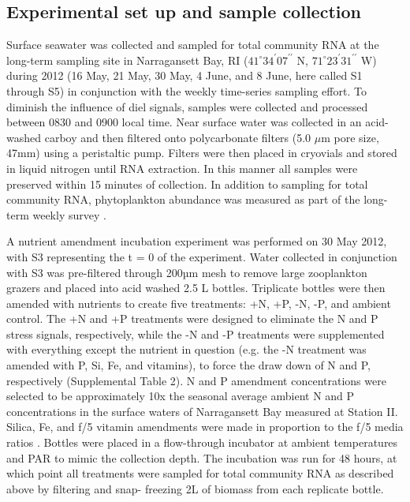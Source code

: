\subsection{Experimental set up and sample collection}
Surface seawater was collected and sampled for total community RNA at the long-term sampling site in Narragansett Bay, RI ($41^\circ 34^\prime 07^{\prime \prime}$ N, $71^\circ 23^\prime 31^{\prime \prime}$ W) during 2012 (16 May, 21 May, 30 May, 4 June, and 8 June, here called S1 through S5) in conjunction with the weekly time-series sampling effort. To diminish the influence of diel signals, samples were collected and processed between 0830 and 0900 local time. Near surface water was collected in an acid-washed carboy and then filtered onto polycarbonate filters (5.0 $\mu$m pore size, 47mm) using a peristaltic pump. Filters were then placed in cryovials and stored in liquid nitrogen until RNA extraction. In this manner all samples were preserved within 15 minutes of collection. In addition to sampling for total community RNA, phytoplankton abundance was measured as part of the long-term weekly survey \citep{Furnas1983, Furnas1982}.\par
A nutrient amendment incubation experiment was performed on 30 May 2012, with S3 representing the t = 0 of the experiment. Water collected in conjunction with S3 was pre-filtered through 200µm mesh to remove large zooplankton grazers and placed into acid washed 2.5 L bottles. Triplicate bottles were then amended with nutrients to create five treatments: +N, +P, -N, -P, and ambient control. The +N and +P treatments were designed to eliminate the N and P stress signals, respectively, while the -N and -P treatments were supplemented with everything except the nutrient in question (e.g. the -N treatment was amended with P, Si, Fe, and vitamins), to force the draw down of N and P, respectively (Supplemental Table 2). N and P amendment concentrations were selected to be approximately 10x the seasonal average ambient N and P concentrations in the surface waters of Narragansett Bay measured at Station II. Silica, Fe, and f/5 vitamin amendments were made in proportion to the f/5 media ratios \citep{Guillard1975}. Bottles were placed in a flow-through incubator at ambient temperatures and PAR to mimic the collection depth. The incubation was run for 48 hours, at which point all treatments were sampled for total community RNA as described above by filtering and snap- freezing 2L of biomass from each replicate bottle. \par

